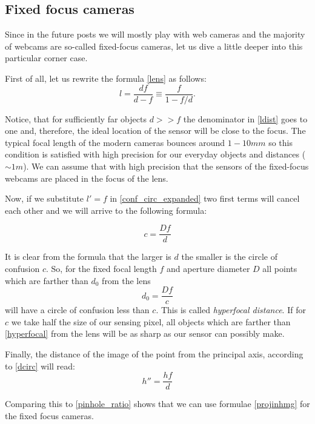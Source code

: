 \documentclass[a4paper,10pt]{article}
\begin{document}
\subsection{Fixed focus cameras}

Since in the future posts we will mostly play with web cameras and the majority of webcams are so-called fixed-focus cameras, let us dive a little deeper into this particular corner case.

First of all, let us rewrite the formula \eqref{lens} as follows:
\begin{equation}
l=\frac{df}{d-f}\equiv\frac{f}{1 - f/d}.\label{ldist}
\end{equation}

Notice, that for sufficiently far objects $d >> f$ the denominator in \eqref{ldist} goes to one and, therefore, the ideal location of the sensor will be close to the focus. The typical focal length of the modern cameras bounces around $1-10 mm$ so this condition is satisfied with high precision for our everyday objects and distances ($\sim 1m$). We can assume that with high precision that the sensors of the fixed-focus webcams are placed in the focus of the lens. 

Now, if we substitute $l'=f$ in \eqref{conf_circ_expanded} two first terms will cancel each other and we will arrive to the following formula:

\begin{equation}
c=\frac{Df}{d}
\end{equation}

It is clear from the formula that the larger is $d$ the smaller is the circle of confusion $c$. So, for the fixed focal length $f$ and aperture diameter $D$ all points which are farther than $d_0$ from the lens
\begin{equation}
d_0 = \frac{Df}{c} \label{hyperfocal}
\end{equation}
will have a circle of confusion less than $c$. This is called {\it hyperfocal distance}. If for $c$ we take half the size of our sensing pixel, all objects which are farther than \eqref{hyperfocal} from the lens will be as sharp as our sensor can possibly make. 

Finally, the distance of the image of the point from the principal axis, according to \eqref{dcirc} will read:
\begin{equation}
h'' = \frac{hf}{d}
\end{equation}

Comparing this to \eqref{pinhole_ratio} shows that we can use formulae  \eqref{projinhmg} for the fixed focus cameras.
\end{document}
